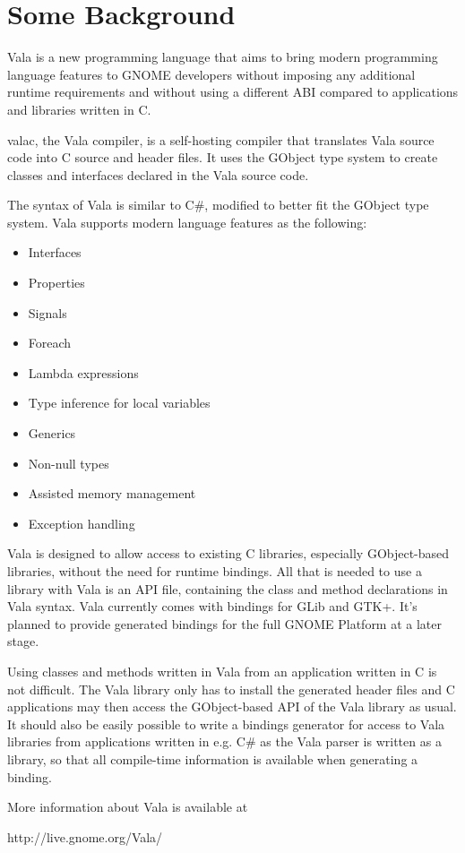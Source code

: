 \documentclass[openany]{book}
\begin{document}
\vspace{0.25in}

\chapter{Some Background}
Vala is a new programming language that aims to bring modern programming language features to GNOME developers without imposing any additional runtime requirements and without using a different ABI compared to applications and libraries written in C.

valac, the Vala compiler, is a self-hosting compiler that translates Vala source code into C source and header files. It uses the GObject type system to create classes and interfaces declared in the Vala source code.

The syntax of Vala is similar to C\#, modified to better fit the GObject type system. Vala supports modern language features as the following:

\begin{itemize}
	\item Interfaces
	\item Properties
	\item Signals
	\item Foreach
	\item Lambda expressions
	\item Type inference for local variables
	\item Generics
	\item Non-null types
	\item Assisted memory management
	\item Exception handling
\end{itemize}

Vala is designed to allow access to existing C libraries, especially GObject-based libraries, without the need for runtime bindings. All that is needed to use a library with Vala is an API file, containing the class and method declarations in Vala syntax. Vala currently comes with bindings for GLib and GTK+. It's planned to provide generated bindings for the full GNOME Platform at a later stage.

Using classes and methods written in Vala from an application written in C is not difficult. The Vala library only has to install the generated header files and C applications may then access the GObject-based API of the Vala library as usual. It should also be easily possible to write a bindings generator for access to Vala libraries from applications written in e.g. C\# as the Vala parser is written as a library, so that all compile-time information is available when generating a binding.

More information about Vala is available at

	http://live.gnome.org/Vala/

\inputminted[linenos=true,bgcolor=bg]{vala}{src/main.vala}
\end{document}
